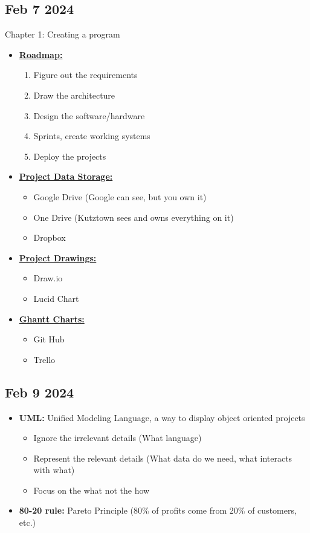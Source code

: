 \documentclass[12pt]{article}
\begin{document}
\subsection*{Feb 7 2024}

Chapter 1: Creating a program

\begin{itemize}
		  \item \textbf{\underline{Roadmap:}}
					 \begin{enumerate}
								\item Figure out the requirements 
								\item Draw the architecture
								\item Design the software/hardware
								\item Sprints, create working systems
								\item Deploy the projects
					 \end{enumerate}
		  \item \textbf{\underline{Project Data Storage:}}
					 \begin{itemize}
								\item Google Drive (Google can see, but you own it)
								\item One Drive (Kutztown sees and owns everything on it)
								\item Dropbox
					 \end{itemize}
		  \item \textbf{\underline{Project Drawings:}}
					 \begin{itemize}
								\item Draw.io
								\item Lucid Chart
					 \end{itemize}
		  \item \textbf{\underline{Ghantt Charts:}}
					 \begin{itemize}
								\item Git Hub
								\item Trello
					 \end{itemize}
\end{itemize}

\subsection*{Feb 9 2024}

\begin{itemize}
		  \item \textbf{UML:} Unified Modeling Language, a way to display object oriented projects
					 \begin{itemize}
		  				  		\item Ignore the irrelevant details (What language)
		  				  		\item Represent the relevant details (What data do we need, what interacts with what)
								\item Focus on the what not the how
					 \end{itemize}
		  \item \textbf{80-20 rule:} Pareto Principle (80\% of profits come from 20\% of customers, etc.)

\end{itemize}
\end{document}
